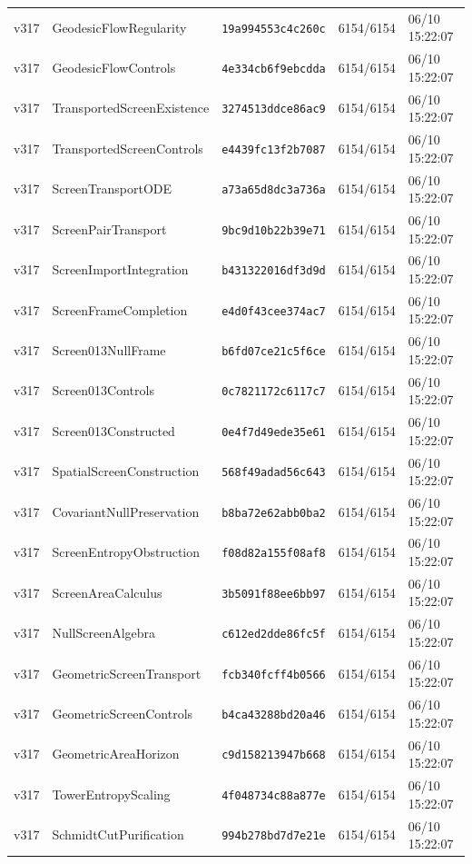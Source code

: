 \documentclass[11pt]{article}
\theoremstyle{definition}\newtheorem{deriv}{Derivation}
\begin{document}
{\begin{longtable}{@{}lllll@{}}
v317 & GeodesicFlowRegularity & \texttt{19a994553c4c260c} & 6154/6154 & 06/10 15:22:07 \\
v317 & GeodesicFlowControls & \texttt{4e334cb6f9ebcdda} & 6154/6154 & 06/10 15:22:07 \\
v317 & TransportedScreenExistence & \texttt{3274513ddce86ac9} & 6154/6154 & 06/10 15:22:07 \\
v317 & TransportedScreenControls & \texttt{e4439fc13f2b7087} & 6154/6154 & 06/10 15:22:07 \\
v317 & ScreenTransportODE & \texttt{a73a65d8dc3a736a} & 6154/6154 & 06/10 15:22:07 \\
v317 & ScreenPairTransport & \texttt{9bc9d10b22b39e71} & 6154/6154 & 06/10 15:22:07 \\
v317 & ScreenImportIntegration & \texttt{b431322016df3d9d} & 6154/6154 & 06/10 15:22:07 \\
v317 & ScreenFrameCompletion & \texttt{e4d0f43cee374ac7} & 6154/6154 & 06/10 15:22:07 \\
v317 & Screen013NullFrame & \texttt{b6fd07ce21c5f6ce} & 6154/6154 & 06/10 15:22:07 \\
v317 & Screen013Controls & \texttt{0c7821172c6117c7} & 6154/6154 & 06/10 15:22:07 \\
v317 & Screen013Constructed & \texttt{0e4f7d49ede35e61} & 6154/6154 & 06/10 15:22:07 \\
v317 & SpatialScreenConstruction & \texttt{568f49adad56c643} & 6154/6154 & 06/10 15:22:07 \\
v317 & CovariantNullPreservation & \texttt{b8ba72e62abb0ba2} & 6154/6154 & 06/10 15:22:07 \\
v317 & ScreenEntropyObstruction & \texttt{f08d82a155f08af8} & 6154/6154 & 06/10 15:22:07 \\
v317 & ScreenAreaCalculus & \texttt{3b5091f88ee6bb97} & 6154/6154 & 06/10 15:22:07 \\
v317 & NullScreenAlgebra & \texttt{c612ed2dde86fc5f} & 6154/6154 & 06/10 15:22:07 \\
v317 & GeometricScreenTransport & \texttt{fcb340fcff4b0566} & 6154/6154 & 06/10 15:22:07 \\
v317 & GeometricScreenControls & \texttt{b4ca43288bd20a46} & 6154/6154 & 06/10 15:22:07 \\
v317 & GeometricAreaHorizon & \texttt{c9d158213947b668} & 6154/6154 & 06/10 15:22:07 \\
v317 & TowerEntropyScaling & \texttt{4f048734c88a877e} & 6154/6154 & 06/10 15:22:07 \\
v317 & SchmidtCutPurification & \texttt{994b278bd7d7e21e} & 6154/6154 & 06/10 15:22:07 \\

\end{longtable}}
\end{document}
